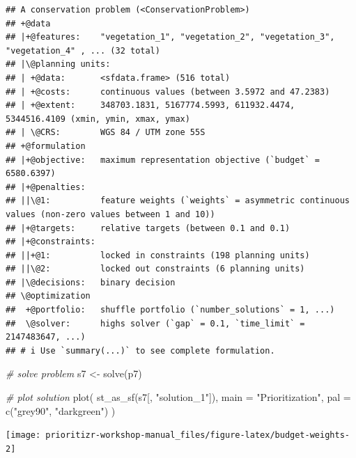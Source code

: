 \documentclass[
  12pt,
]{book}
\newenvironment{Shaded}{\begin{snugshade}}{\end{snugshade}}
\newcommand{\AttributeTok}[1]{\textcolor[rgb]{0.77,0.63,0.00}{#1}}
\newcommand{\CommentTok}[1]{\textcolor[rgb]{0.56,0.35,0.01}{\textit{#1}}}
\newcommand{\ConstantTok}[1]{\textcolor[rgb]{0.00,0.00,0.00}{#1}}
\newcommand{\FloatTok}[1]{\textcolor[rgb]{0.00,0.00,0.81}{#1}}
\newcommand{\FunctionTok}[1]{\textcolor[rgb]{0.00,0.00,0.00}{#1}}
\newcommand{\NormalTok}[1]{#1}
\newcommand{\OtherTok}[1]{\textcolor[rgb]{0.56,0.35,0.01}{#1}}
\newcommand{\SpecialCharTok}[1]{\textcolor[rgb]{0.00,0.00,0.00}{#1}}
\newcommand{\StringTok}[1]{\textcolor[rgb]{0.31,0.60,0.02}{#1}}
\begin{document}
\begin{verbatim}
## A conservation problem (<ConservationProblem>)
## +@data
## |+@features:    "vegetation_1", "vegetation_2", "vegetation_3", "vegetation_4" , ... (32 total)
## |\@planning units:
## | +@data:       <sfdata.frame> (516 total)
## | +@costs:      continuous values (between 3.5972 and 47.2383)
## | +@extent:     348703.1831, 5167774.5993, 611932.4474, 5344516.4109 (xmin, ymin, xmax, ymax)
## | \@CRS:        WGS 84 / UTM zone 55S
## +@formulation
## |+@objective:   maximum representation objective (`budget` = 6580.6397)
## |+@penalties:
## ||\@1:          feature weights (`weights` = asymmetric continuous values (non-zero values between 1 and 10))
## |+@targets:     relative targets (between 0.1 and 0.1)
## |+@constraints:
## ||+@1:          locked in constraints (198 planning units)
## ||\@2:          locked out constraints (6 planning units)
## |\@decisions:   binary decision
## \@optimization
##  +@portfolio:   shuffle portfolio (`number_solutions` = 1, ...)
##  \@solver:      highs solver (`gap` = 0.1, `time_limit` = 2147483647, ...)
## # i Use `summary(...)` to see complete formulation.
\end{verbatim}

\begin{Shaded}
\begin{Highlighting}[]
\CommentTok{\# solve problem}
\NormalTok{s7 }\OtherTok{\textless{}{-}} \FunctionTok{solve}\NormalTok{(p7)}

\CommentTok{\# plot solution}
\FunctionTok{plot}\NormalTok{(}
  \FunctionTok{st\_as\_sf}\NormalTok{(s7[, }\StringTok{"solution\_1"}\NormalTok{]), }\AttributeTok{main =} \StringTok{"Prioritization"}\NormalTok{,}
  \AttributeTok{pal =} \FunctionTok{c}\NormalTok{(}\StringTok{"grey90"}\NormalTok{, }\StringTok{"darkgreen"}\NormalTok{)}
\NormalTok{)}
\end{Highlighting}
\end{Shaded}

\begin{center}\texttt{[image: prioritizr-workshop-manual\_files/figure-latex/budget-weights-2]} \end{center}

\begin{Shaded}
\end{Shaded}
\end{document}
